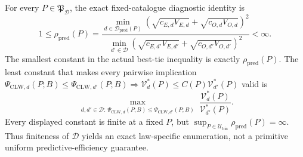 For every \(P\in\mathfrak P_{\mathcal D}\), the exact fixed-catalogue diagnostic identity is
\[
 1\le\rho_{\mathrm{pred}}(P)
 =\frac{\min_{d\in\mathcal D_{\mathrm{pred}}(P)}
 (\sqrt{c_{E,d}V_{E,d}}+\sqrt{c_{O,d}V_{O,d}})^2}
 {\min_{d'\in\mathcal D}
 (\sqrt{c_{E,d'}V_{E,d'}}+\sqrt{c_{O,d'}V_{O,d'}})^2}<\infty.
\]
The smallest constant in the actual best-tie inequality is exactly \(\rho_{\mathrm{pred}}(P)\). The least constant that makes every pairwise implication
\(\Psi_{\mathrm{CLW},d}(P;B)\le\Psi_{\mathrm{CLW},d'}(P;B)\Rightarrow \mathcal V_d^*(P)\le C(P)\mathcal V_{d'}^*(P)\)
valid is
\[
 \max_{\substack{d,d'\in\mathcal D:\,
 \Psi_{\mathrm{CLW},d}(P;B)\le\Psi_{\mathrm{CLW},d'}(P;B)}}
 \frac{\mathcal V_d^*(P)}{\mathcal V_{d'}^*(P)}.
\]
Every displayed constant is finite at a fixed \(P\), but \(\sup_{P\in\mathcal U_{\mathrm{bin}}}\rho_{\mathrm{pred}}(P)=\infty\). Thus finiteness of \(\mathcal D\) yields an exact law-specific enumeration, not a primitive uniform predictive-efficiency guarantee.